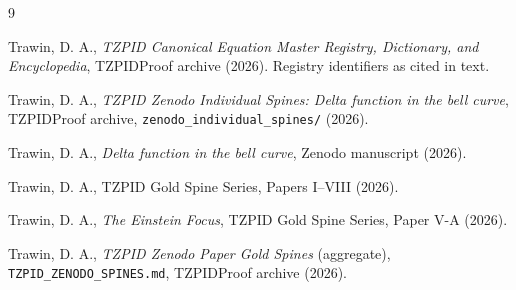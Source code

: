 \documentclass[11pt]{article}
\theoremstyle{remark}
\begin{document}
\begin{thebibliography}{9}

 Trawin, D. A., \emph{TZPID Canonical Equation Master Registry, Dictionary, and Encyclopedia}, TZPIDProof archive (2026). Registry identifiers as cited in text.

 Trawin, D. A., \emph{TZPID Zenodo Individual Spines: Delta function in the bell curve}, TZPIDProof archive, \texttt{zenodo\_individual\_spines/} (2026).

 Trawin, D. A., \emph{Delta function in the bell curve}, Zenodo manuscript (2026).

 Trawin, D. A., TZPID Gold Spine Series, Papers I--VIII (2026).

 Trawin, D. A., \emph{The Einstein Focus}, TZPID Gold Spine Series, Paper V-A (2026).

 Trawin, D. A., \emph{TZPID Zenodo Paper Gold Spines} (aggregate), \texttt{TZPID\_ZENODO\_SPINES.md}, TZPIDProof archive (2026).

\end{thebibliography}
\end{document}
